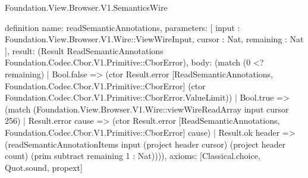 \begin{lexlean}{Foundation.View.Browser.V1.SemanticsWire}
\begin{semanticmodule}
definition{
  name: readSemanticAnnotations,
  parameters: [
    input : Foundation.View.Browser.V1.Wire::ViewWireInput,
    cursor : Nat,
    remaining : Nat
  ],
  result: (Result ReadSemanticAnnotations Foundation.Codec.Cbor.V1.Primitive::CborError),
  body: (match (0 <? remaining)
    | Bool.false => (ctor Result.error [ReadSemanticAnnotations, Foundation.Codec.Cbor.V1.Primitive::CborError] (ctor Foundation.Codec.Cbor.V1.Primitive::CborError.ValueLimit))
    | Bool.true => (match (Foundation.View.Browser.V1.Wire::viewWireReadArray input cursor 256)
      | Result.error cause => (ctor Result.error [ReadSemanticAnnotations, Foundation.Codec.Cbor.V1.Primitive::CborError] cause)
      | Result.ok header => (readSemanticAnnotationItems input (project header cursor) (project header count) (prim subtract remaining 1 : Nat)))),
  axioms: [Classical.choice, Quot.sound, propext]
}


\end{semanticmodule}
\end{lexlean}
